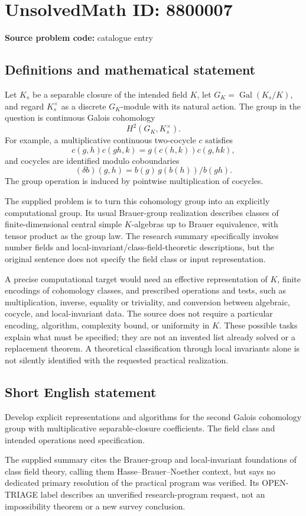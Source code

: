 \documentclass[11pt]{article}
\begin{document}
\section*{UnsolvedMath ID: 8800007}
\textbf{Source problem code:} catalogue entry
\subsection{Definitions and mathematical statement}
Let $K_s$ be a separable closure of the intended field $K$, let $G_K=\operatorname{Gal}(K_s/K)$, and regard $K_s^\times$ as a discrete $G_K$-module with its natural action. The group in the question is continuous Galois cohomology
\[
 H^2(G_K,K_s^\times).
\]
For example, a multiplicative continuous two-cocycle $c$ satisfies
\[
 c(g,h)c(gh,k)=g(c(h,k))c(g,hk),
\]
and cocycles are identified modulo coboundaries
\[
 (\delta b)(g,h)=b(g)\,g(b(h))/b(gh).
\]
The group operation is induced by pointwise multiplication of cocycles.

The supplied problem is to turn this cohomology group into an explicitly computational group. Its usual Brauer-group realization describes classes of finite-dimensional central simple $K$-algebras up to Brauer equivalence, with tensor product as the group law. The research summary specifically invokes number fields and local-invariant/class-field-theoretic descriptions, but the original sentence does not specify the field class or input representation.

A precise computational target would need an effective representation of $K$, finite encodings of cohomology classes, and prescribed operations and tests, such as multiplication, inverse, equality or triviality, and conversion between algebraic, cocycle, and local-invariant data. The source does not require a particular encoding, algorithm, complexity bound, or uniformity in $K$. These possible tasks explain what must be specified; they are not an invented list already solved or a replacement theorem. A theoretical classification through local invariants alone is not silently identified with the requested practical realization.
\subsection{Short English statement}
Develop explicit representations and algorithms for the second Galois cohomology group with multiplicative separable-closure coefficients. The field class and intended operations need specification.

The supplied summary cites the Brauer-group and local-invariant foundations of class field theory, calling them Hasse--Brauer--Noether context, but says no dedicated primary resolution of the practical program was verified. Its OPEN-TRIAGE label describes an unverified research-program request, not an impossibility theorem or a new survey conclusion.
\end{document}
